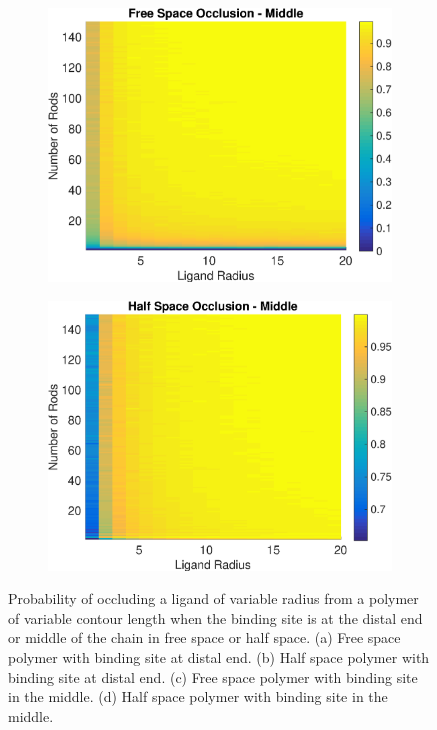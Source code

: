 \documentclass[../../AdvancementSummary.tex]{subfiles}
\begin{document}
\begin{figure}[H]
\begin{center}
\begin{subfigure}{0.4\linewidth}
\caption{}
\end{subfigure}
\begin{subfigure}{0.4\linewidth}
\includegraphics[width=\linewidth]{ResultsFigures/General/OcclusionVSNVSRFreeMid.eps}
\caption{}
\end{subfigure}
\begin{subfigure}{0.4\linewidth}
\includegraphics[width=\linewidth]{ResultsFigures/General/OcclusionVSNVSRHalfMid.eps}
\caption{}
\end{subfigure}
\caption{Probability of occluding a ligand of variable radius from a polymer of variable contour length when the binding site is at the distal end or middle of the chain in free space or half space. (a) Free space polymer with binding site at distal end. (b) Half space polymer with binding site at distal end. (c) Free space polymer with binding site in the middle. (d) Half space polymer with binding site in the middle.\label{fig: OcclusionVSNVSR}}
\end{center}
\end{figure}
\end{document}
